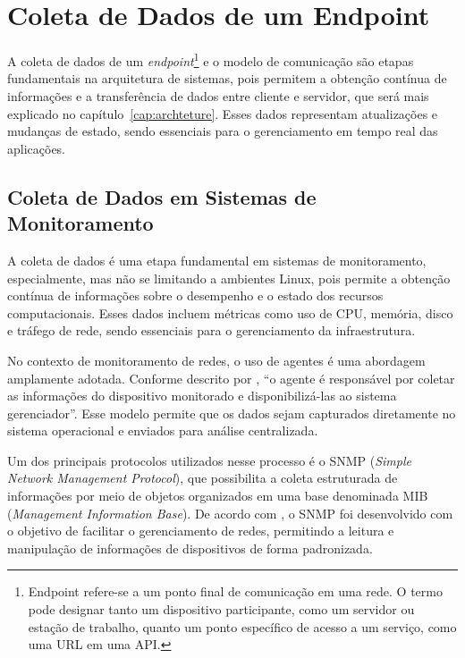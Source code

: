 \documentclass[
    12pt
    ,oneside
    ,a4paper
    ,chapter=TITLE
    ,section=TITLE
    ,sumario=abnt-6027-2012]{abntex2}
\begin{document}
\chapter{Coleta de Dados de um Endpoint}
\label{cap:data-collect}

A coleta de dados de um \textit{endpoint}\footnote{Endpoint refere-se a um ponto final de comunicação em uma rede. O termo pode designar tanto um dispositivo participante, como um servidor ou estação de trabalho, quanto um ponto específico de acesso a um serviço, como uma URL em uma API.} e o modelo de comunicação são etapas fundamentais na arquitetura de sistemas, pois permitem a obtenção contínua de informações e a transferência de dados entre cliente e servidor, que será mais explicado no capítulo~\ref{cap:archteture}. Esses dados representam atualizações e mudanças de estado, sendo essenciais para o gerenciamento em tempo real das aplicações.

\section{Coleta de Dados em Sistemas de Monitoramento}

A coleta de dados é uma etapa fundamental em sistemas de monitoramento, especialmente, mas não se limitando a ambientes Linux, pois permite a obtenção contínua de informações sobre o desempenho e o estado dos recursos computacionais. Esses dados incluem métricas como uso de CPU, memória, disco e tráfego de rede, sendo essenciais para o gerenciamento da infraestrutura.

No contexto de monitoramento de redes, o uso de agentes é uma abordagem amplamente adotada. Conforme descrito por , “o agente é responsável por coletar as informações do dispositivo monitorado e disponibilizá-las ao sistema gerenciador”. Esse modelo permite que os dados sejam capturados diretamente no sistema operacional e enviados para análise centralizada.

Um dos principais protocolos utilizados nesse processo é o SNMP (\textit{Simple Network Management Protocol}), que possibilita a coleta estruturada de informações por meio de objetos organizados em uma base denominada MIB (\textit{Management Information Base}). De acordo com , o SNMP foi desenvolvido com o objetivo de facilitar o gerenciamento de redes, permitindo a leitura e manipulação de informações de dispositivos de forma padronizada.
\end{document}
